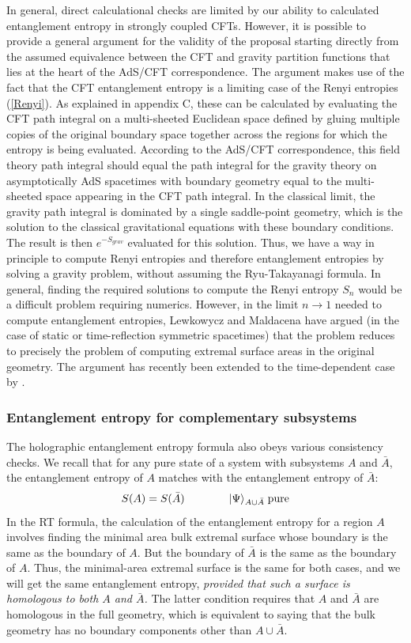 \documentclass[12pt,epsf]{article}
\newcommand{\be}{\begin{equation}}
\newcommand{\ee}{\end{equation}}
\begin{document}
In general, direct calculational checks are limited by our ability to calculated entanglement entropy in strongly coupled CFTs. However, it is possible to provide a general argument for the validity of the proposal starting directly from the assumed  equivalence between the CFT and gravity partition functions that lies at the heart of the AdS/CFT correspondence. The argument makes use of the fact that the CFT entanglement entropy is a limiting case of the Renyi entropies (\ref{Renyi}). As explained in appendix C, these can be calculated by evaluating the CFT path integral on a multi-sheeted Euclidean space defined by gluing multiple copies of the original boundary space together across the regions for which the entropy is being evaluated. According to the AdS/CFT correspondence, this field theory path integral should equal the path integral for the gravity theory on asymptotically AdS spacetimes with boundary geometry equal to the multi-sheeted space appearing in the CFT path integral. In the classical limit, the gravity path integral is dominated by a single saddle-point geometry, which is the solution to the classical gravitational equations with these boundary conditions. The result is then $e^{-S_{grav}}$ evaluated for this solution. Thus, we have a way in principle to compute Renyi entropies and therefore entanglement entropies by solving a gravity problem, without assuming the Ryu-Takayanagi formula. In general, finding the required solutions to compute the Renyi entropy $S_n$ would be a difficult problem requiring numerics. However, in the limit $n \to 1$ needed to compute entanglement entropies, Lewkowycz and Maldacena have argued (in the case of static or time-reflection symmetric spacetimes) \cite{Lewkowycz:2013nqa} that the problem reduces to precisely the problem of computing extremal surface areas in the original geometry. The argument has recently been extended to the time-dependent case by \cite{Dong:2016hjy}.

\subsubsection*{Entanglement entropy for complementary subsystems}

The holographic entanglement entropy formula also obeys various consistency checks. We recall that for any pure state of a system with subsystems $A$ and $\bar{A}$, the entanglement entropy of $A$ matches with the entanglement entropy of $\bar{A}$:
\be
\label{purestate}
S(A) = S(\bar{A}) \qquad \qquad |\Psi \rangle_{A \cup \bar{A}} \; {\rm pure}
\ee
In the RT formula, the calculation of the entanglement entropy for a region $A$ involves finding the minimal area bulk extremal surface whose boundary is the same as the boundary of $A$. But the boundary of $\bar{A}$ is the same as the boundary of $A$. Thus, the minimal-area extremal surface is the same for both cases, and we will get the same entanglement entropy, {\it provided that such a surface is homologous to both $A$ and $\bar{A}$.} The latter condition requires that $A$ and $\bar{A}$ are homologous in the full geometry, which is equivalent to saying that the bulk geometry has no boundary components other than $A \cup \bar{A}$.
\end{document}
